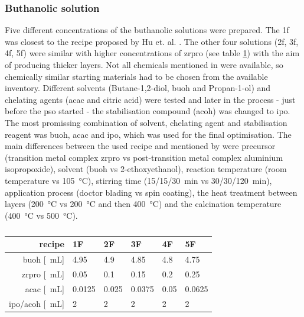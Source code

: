 \documentclass[a4paper]{article}
\newcommand{\todo}[1]{\textbf{\textcolor{red}{#1}}}
\newcommand{\td}[1]{\textcolor{red}{#1}}
\newcommand{\ml}[1]{\SI{#1}{\milli\liter}}
\begin{document}
\subsubsection{Buthanolic solution}
\label{sec:sol}
Five different concentrations of the buthanolic solutions were prepared. 
The \gls{1f} was closest to the recipe proposed by Hu et. al. \cite{Hu2016}. 
The other four solutions (\gls{2f}, \gls{3f}, \gls{4f}, \gls{5f}) were similar with 
higher concentrations of \gls{zrpro} (see table \ref{tab:rec2})
with the aim of producing thicker layers.
Not all chemicals mentioned in \cite{Hu2016} were available, so chemically similar 
starting materials had to be chosen from the available inventory. 
Different solvents (Butane-1,2-diol, \gls{buoh} and Propan-1-ol) and chelating agents 
(\gls{acac} and citric acid) were tested and later in the process - just before the 
\gls{pso} started - the stabilisation compound (\gls{acoh}) was changed to \gls{ipo}.
The most promissing combination of solvent, chelating agent and stabilisation reagent was 
\gls{buoh}, \gls{acac} and \gls{ipo}, which was used for the final optimisation.
The main differences between the used recipe and mentioned by \cite{Hu2016} were 
precursor (transition metal complex \gls{zrpro}	\gls{vs} post-transition metal 
complex aluminium isopropoxide), solvent (\gls{buoh} \gls{vs} 2-ethoxyethanol), reaction temperature 
(room temperature \gls{vs} \SI{105}{\celsius}), stirring time (15/15/\SI{30}{\minute}
\gls{vs} 30/30/\SI{120}{\minute}), application process (doctor blading \gls{vs} spin coating), 
the heat treatment between layers (\SI{200}{\celsius} \gls{vs} \SI{200}{\celsius} and then \SI{400}
{\celsius}) and the calcination temperature (\SI{400}{\celsius} \gls{vs}
\SI{500}{\celsius}).

\begin{table}[h]
	\centering
	\caption{}
	\label{tab:rec2}
	\begin{tabular}{rlllll}
		\hline
		recipe	&1F		&2F		&3F		&4F		&5F		\\
		\hline
		\gls{buoh} [\ml{}]		&4.95	&4.9	&4.85	&4.8	&4.75	\\
		\gls{zrpro} [\ml{}]	&0.05	&0.1	&0.15	&0.2	&0.25	\\
		\gls{acac} [\ml{}]		&0.0125	&0.025	&0.0375	&0.05	&0.0625	\\
		\gls{ipo}/\gls{acoh} [\ml{}]		&2		&2		&2		&2		&2		\\
		\hline
	\end{tabular}
\end{table}
\end{document}
